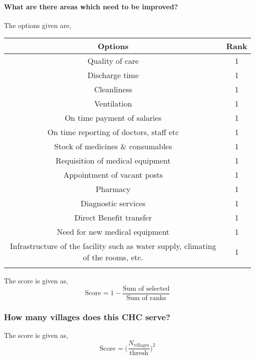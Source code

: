 \documentclass[oneside]{article}
\newcommand{\tsub}[2]{\text{#1}_{\text{#2}}}
\newcommand{\tsubb}[2]{#1_{\text{#2}}}
\newcommand{\dsub}[2]{\dfrac{\text{#1}}{\text{#2}}}
\newenvironment{ttable}
{
\begin{center}
\begin{tabular}{c|c}
\hline
}
{
\\ \hline
\end{tabular}
\end{center}
}
\begin{document}
\paragraph{ What are there areas which need to be improved?}

The options given are,
\begin{ttable}
Options & Rank \\ \hline
Quality of care & 1 \\
Discharge time & 1 \\
Cleanliness & 1 \\
Ventilation & 1 \\
On time payment of salaries & 1 \\
On time reporting of doctors, staff etc & 1 \\
Stock of medicines \& consumables & 1 \\
Requisition of medical equipment & 1 \\
Appointment of vacant posts & 1 \\
Pharmacy & 1 \\
Diagnostic services & 1 \\
Direct Benefit transfer & 1 \\
Need for new medical equipment & 1 \\
Infrastructure of the facility such as water supply, climating of the rooms, etc. & 1 \\
\hline
\end{ttable}
The score is given as,
\[
	\tsub{Score}{} = 1 - \dsub{Sum of selected}{Sum of ranks}
\]
\subsubsection{How many villages does this CHC serve?}
The score is given as,
\[
	\tsub{Score}{} = \Big(\dfrac{\tsubb{N}{villages}}{\text{thresh}}\Big)^{2}
\]
\end{document}

